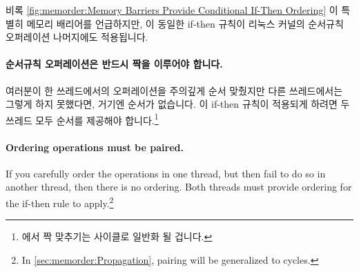 비록
\cref{fig:memorder:Memory Barriers Provide Conditional If-Then Ordering}
이 특별히 메모리 배리어를 언급하지만, 이 동일한 if-then 규칙이 리눅스 커널의
순서규칙 오퍼레이션 나머지에도 적용됩니다.

\paragraph{순서규칙 오퍼레이션은 반드시 짝을 이루어야 합니다.}
여러분이 한 쓰레드에서의 오퍼레이션을 주의깊게 순서 맞췄지만 다른 쓰레드에서는
그렇게 하지 못했다면, 거기엔 순서가 없습니다.
이 if-then 규칙이 적용되게 하려면 두 쓰레드 모두 순서를 제공해야
합니다.\footnote{
	 에서 짝 맞추기는 사이클로 일반화 될
	겁니다.}

\iffalse

\paragraph{Ordering operations must be paired.}
If you carefully order the operations in one thread, but then fail to do
so in another thread, then there is no ordering.
Both threads must provide ordering for the if-then rule to apply.\footnote{
	In \cref{sec:memorder:Propagation}, pairing will be
	generalized to cycles.}


